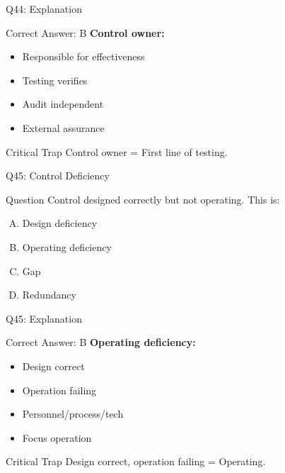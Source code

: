 \documentclass{beamer}
\begin{document}
			\begin{frame}{Q44: Explanation}
				\begin{block}{Correct Answer: B}
					\textbf{Control owner:}
					\begin{itemize}
						\item Responsible for effectiveness
						\item Testing verifies
						\item Audit independent
						\item External assurance
					\end{itemize}
				\end{block}
				\begin{alertblock}{Critical Trap}
					Control owner = First line of testing.
				\end{alertblock}
			\end{frame}
			
			\begin{frame}{Q45: Control Deficiency}
				\begin{block}{Question}
					Control designed correctly but not operating. This is:
				\end{block}
				\begin{enumerate}[(A)]
					\item Design deficiency
					\item Operating deficiency
					\item Gap
					\item Redundancy
				\end{enumerate}
			\end{frame}
			
			\begin{frame}{Q45: Explanation}
				\begin{block}{Correct Answer: B}
					\textbf{Operating deficiency:}
					\begin{itemize}
						\item Design correct
						\item Operation failing
						\item Personnel/process/tech
						\item Focus operation
					\end{itemize}
				\end{block}
				\begin{alertblock}{Critical Trap}
					Design correct, operation failing = Operating.
				\end{alertblock}
			\end{frame}
			
\end{document}
